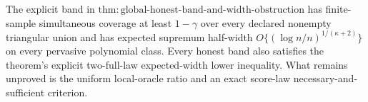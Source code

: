 The explicit band in \(\mathrm{thm:global\text{-}honest\text{-}band\text{-}and\text{-}width\text{-}obstruction}\) has finite-sample simultaneous coverage at least \(1-\gamma\) over every declared nonempty triangular union and has expected supremum half-width \(O\{(\log n/n)^{1/(\kappa+2)}\}\) on every pervasive polynomial class.  Every honest band also satisfies the theorem's explicit two-full-law expected-width lower inequality.  What remains unproved is the uniform local-oracle ratio and an exact score-law necessary-and-sufficient criterion.